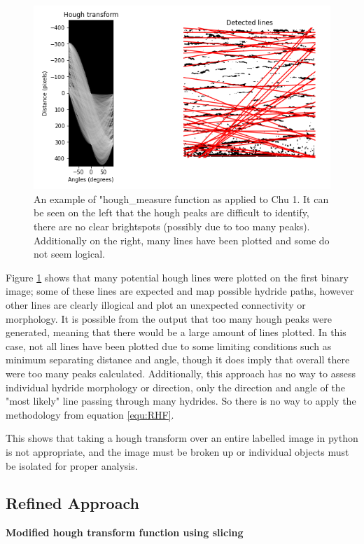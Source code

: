 \documentclass{article}
\begin{document}
    \begin{figure}[H]
        \centering
        \includegraphics[scale=0.7]{Figures/houghtrans_initial.png}
        \caption{An example of "hough\_measure function as applied to Chu 1. It can be seen on the left that the hough peaks are difficult to identify, there are no clear brightspots (possibly due to too many peaks). Additionally on the right, many lines have been plotted and some do not seem logical.}
        \label{fig:hough_initial}
    \end{figure}
    
    Figure \ref{fig:hough_initial} shows that many potential hough lines were plotted on the first binary image; some of these lines are expected and map possible hydride paths, however other lines are clearly illogical and plot an unexpected connectivity or morphology. It is possible from the output that too many hough peaks were generated, meaning that there would be a large amount of lines plotted. In this case, not all lines have been plotted due to some limiting conditions such as minimum separating distance and angle, though it does imply that overall there were too many peaks calculated. Additionally, this approach has no way to assess individual hydride morphology or direction, only the direction and angle of the "most likely" line passing through many hydrides. So there is no way to apply the methodology from equation \ref{equ:RHF}.
    
    This shows that taking a hough transform over an entire labelled image in python is not appropriate, and the image must be broken up or individual objects must be isolated for proper analysis.
   

\subsection{Refined Approach}
\textbf{Modified hough transform function using slicing}
    
\end{document}
